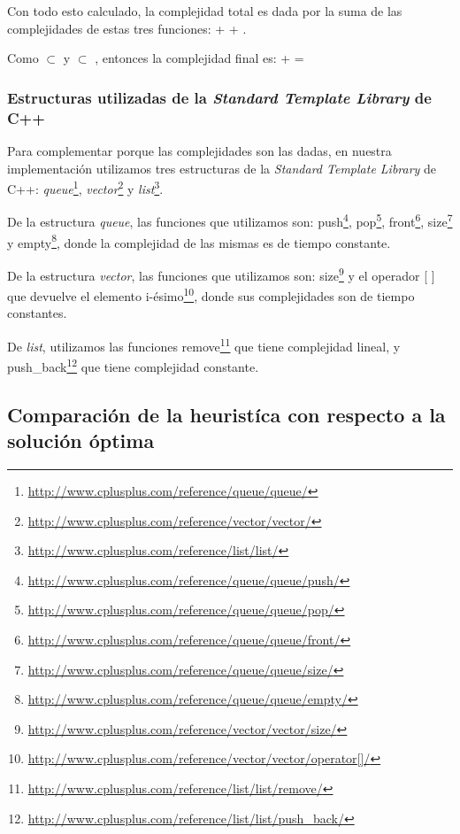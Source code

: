 Con todo esto calculado, la complejidad total es dada por la suma de las complejidades de estas tres funciones:  +  + . 

Como  $\subset$  y  $\subset$ , entonces la complejidad final es:  +  = 

\subsubsection{Estructuras utilizadas de la \textit{Standard Template Library} de C++}

Para complementar porque las complejidades son las dadas, en nuestra implementación utilizamos tres estructuras de la \textit{Standard Template Library} de C++: \emph{queue}\footnote{\url{http://www.cplusplus.com/reference/queue/queue/}}, \emph{vector}\footnote{\url{http://www.cplusplus.com/reference/vector/vector/}} y \emph{list}\footnote{\url{http://www.cplusplus.com/reference/list/list/}}.

De la estructura \emph{queue}, las funciones que utilizamos son: push\footnote{\url{http://www.cplusplus.com/reference/queue/queue/push/}}, pop\footnote{\url{http://www.cplusplus.com/reference/queue/queue/pop/}}, front\footnote{\url{http://www.cplusplus.com/reference/queue/queue/front/}}, size\footnote{\url{http://www.cplusplus.com/reference/queue/queue/size/}} y empty\footnote{\url{http://www.cplusplus.com/reference/queue/queue/empty/}}, donde la complejidad de las mismas es de tiempo constante.

De la estructura \emph{vector}, las funciones que utilizamos son: size\footnote{\url{http://www.cplusplus.com/reference/vector/vector/size/}} y el operador [ ] que devuelve el elemento i-ésimo\footnote{\url{http://www.cplusplus.com/reference/vector/vector/operator[]/}}, donde sus complejidades son de tiempo constantes.

De \emph{list}, utilizamos las funciones remove\footnote{\url{http://www.cplusplus.com/reference/list/list/remove/}} que tiene complejidad lineal, y push\_back\footnote{\url{http://www.cplusplus.com/reference/list/list/push_back/}} que tiene complejidad constante.


\subsection{Comparación de la heurist\'ica con respecto a la solución óptima}

